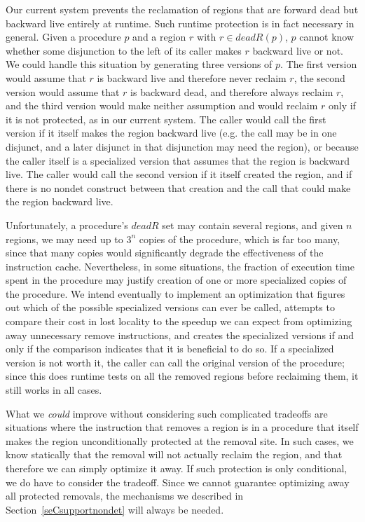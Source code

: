 \documentclass{tlp}
\newcommand{\deadR}[1]{\ensuremath{{deadR}(#1)}}
\def\deadRegs{\mathit{deadR}}
\begin{document}
Our current system prevents the reclamation of regions
that are forward dead but backward live entirely at runtime.
Such runtime protection is in fact necessary in general.
Given a procedure $p$ and a region $r$ with $r \in \deadR{p}$,
$p$ cannot know whether some disjunction to the left of its caller
makes $r$ backward live or not.
We could handle this situation by generating three versions of $p$.
The first version would assume that $r$ is backward live
and therefore never reclaim $r$,
the second version would assume that $r$ is backward dead,
and therefore always reclaim $r$,
and the third version
would make neither assumption
and would reclaim $r$ only if it is not protected,
as in our current system.
The caller would call the first version
if it itself makes the region backward live
(e.g. the call may be in one disjunct,
and a later disjunct in that disjunction may need the region),
or because the caller itself is a specialized version
that assumes that the region is backward live.
The caller would call the second version if it itself created the region,
and if there is no nondet construct between that creation and the call
that could make the region backward live.

Unfortunately, a procedure's $\deadRegs$ set may contain several regions,
and given $n$ regions, we may need up to $3^n$ copies of the procedure,
which is far too many,
since that many copies
would significantly degrade the effectiveness of the instruction cache.
Nevertheless, in some situations,
the fraction of execution time spent in the procedure
may justify creation of one or more specialized copies of the procedure.
We intend eventually to implement an optimization
that figures out which of the possible specialized versions can ever be called,
attempts to compare their cost in lost locality
to the speedup we can expect
from optimizing away unnecessary remove instructions,
and creates the specialized versions if and only if
the comparison indicates that it is beneficial to do so.
If a specialized version is not worth it,
the caller can call the original version of the procedure;
since this does runtime tests on all the removed regions
before reclaiming them, it still works in all cases.

What we \emph{could} improve without considering such complicated tradeoffs
are situations where the instruction that removes a region is in a procedure
that itself makes the region unconditionally protected at the removal site.
In such cases, we know statically
that the removal will not actually reclaim the region,
and that therefore we can simply optimize it away.
If such protection is only conditional,
we do have to consider the tradeoff.
Since we cannot guarantee optimizing away all protected removals,
the mechanisms we described in Section~\ref{seCsupportnondet}
will always be needed.
\end{document}
